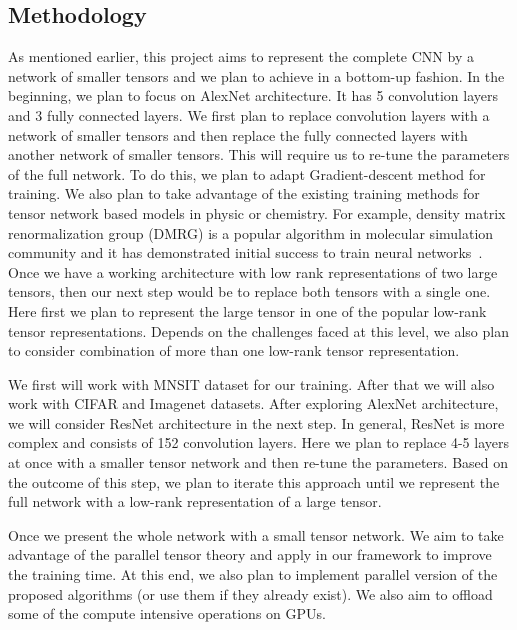 \subsection*{Methodology} 


As mentioned earlier, this project aims to represent the complete CNN by a network of smaller tensors and we plan to achieve in a bottom-up fashion. In the beginning, we plan to focus on AlexNet architecture. It has 5 convolution layers and 3 fully connected layers. We first plan to replace convolution layers with a network of smaller tensors and then replace the fully connected layers with another network of smaller tensors. This will require us to re-tune the parameters of the full network. To do this, we plan to adapt Gradient-descent method for training. We also plan to take advantage of the existing training methods for tensor network based models in physic or chemistry. For example, density matrix renormalization group (DMRG) is a popular algorithm in molecular simulation community and it has demonstrated initial success to train neural networks~\cite{SS-NIPS2016}. Once we have a working architecture with low rank representations of two large tensors, then our next step would be to replace both tensors with a single one. Here first we plan to represent the large tensor in one of the popular low-rank tensor representations. Depends on the challenges faced at this level, we also plan to consider combination of more than one low-rank tensor representation.    


We first will work with  MNSIT dataset for our training. After that we will also work with CIFAR and Imagenet datasets. After exploring AlexNet architecture, we will consider ResNet architecture in the next step. In general, ResNet is more complex and consists of 152 convolution layers. Here we plan to replace 4-5 layers at once with a smaller tensor network and then re-tune the parameters. Based on the outcome of this step, we plan to iterate this approach until we represent the full network with a low-rank representation of a large tensor.  

Once we present the whole network with a small tensor network. We aim to take advantage of the parallel tensor theory and apply in our framework to improve the training time. At this end, we also plan to implement parallel version of the proposed algorithms (or use them if they already exist). We also aim to offload some of the compute intensive operations on GPUs.   

